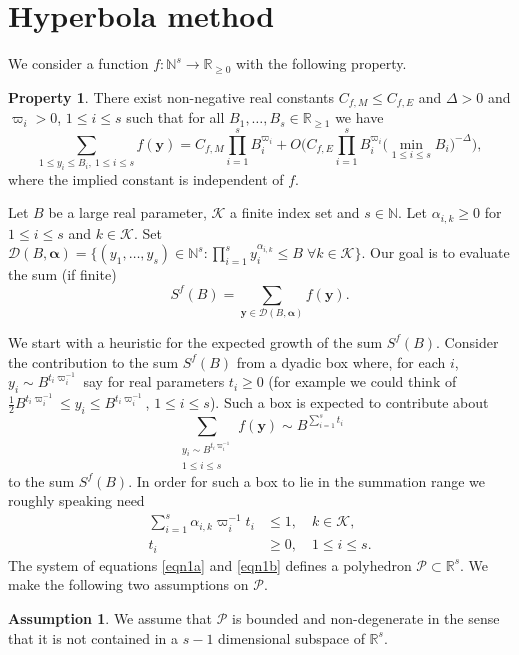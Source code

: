 \documentclass[JEP,XML,SOM,Unicode,published]{cedram}
\newcommand{\cD}{\mathcal{D}}
\newcommand{\cBalp}{\cD(B,\bfalp)}
\let\vardel\varDelta
\newcommand{\bfy}{\boldsymbol{y}}
\newcommand{\bfalp}{\boldsymbol{\alpha}}
\newcommand{\calK}{\mathcal{K}}
\newcommand{\calP}{\mathcal{P}}
\newcommand\NN{\mathbb{N}}
\newcommand{\N}{\mathbb{N}}
\newcommand\R{\mathbb{R}}
\theoremstyle{definition}
\newtheorem{assumption}[theorem]{Assumption}
\newtheorem{property}{Property}
\numberwithin{theorem}{section}
\begin{document}
\section{Hyperbola method}
\label{sec:hyperbola_method}

We consider a function $f: \N^s\rightarrow \R_{\geq 0}$ with the following property.

\begin{property}\label{property:I}
There exist non-negative real constants $C_{f,M}\leq C_{f,E}$ and $\vardel>0$ and $\varpi_i>0$, $1\leq i\leq s$ such that for all $B_1,\ldots, B_s\in \R_{\geq 1}$ we have\vspace*{-3pt}
\[
\sum_{1\leq y_i\leq B_i,\ 1\leq i\leq s} f(\bfy)= C_{f,M} \prod_{i=1}^s B_i^{\varpi_i} +O\biggl(C_{f,E} \prod_{i=1}^s B_i^{\varpi_i} \bigl(\min_{1\leq i\leq s} B_i\bigr)^{-\vardel}\biggr),
\]
where the implied constant is independent of $f$.
\end{property}

Let $B$ be a large real parameter, $\calK$ a finite index set and $s\in \N$. Let $\alpha_{i,k}\geq 0$ for $1\leq i\leq s$ and $k\in \calK$. Set $\cBalp=\{(y_1,\dots,y_s)\in\NN^s:\prod_{i=1}^sy_i^{\alpha_{i,k}}\leq B\;\forall k\in\calK\}$. Our goal is to evaluate the sum (if finite)\vspace*{-3pt}
\[
S^{f}(B)=\sum_{\bfy\in\cBalp}f(\bfy).
\]

We start with a heuristic for the expected growth of the sum $S^f(B)$. Consider the contribution to the sum $S^f(B)$ from a dyadic box where, for each $i$, $y_i\sim B^{t_i\varpi_i^{-1}}$ say for real parameters $t_i\geq 0$ (for example we could think of $\tfrac{1}{2} B^{t_i\varpi_i^{-1}}\leq y_i\leq B^{t_i\varpi_i^{-1}}$, $1\leq i\leq s$). Such a box is expected to contribute about
\[
\sum_{\substack{y_i\sim B^{t_i\varpi_i^{-1}}\\ 1\leq i\leq s}} f(\bfy) \sim B^{\sum_{i=1}^s t_i}
\]
to the sum $S^f(B)$.
In order for such a box to lie in the summation range we roughly speaking need\vspace*{-4pt}
\begin{align}\label{eqn1a}
\sum_{i=1}^s \alpha_{i,k} \varpi_i^{-1} t_i&\leq 1, \quad k\in \calK,
\\
\label{eqn1b}
t_i&\geq 0,\quad 1\leq i\leq s.
\end{align}
The system of equations \eqref{eqn1a} and \eqref{eqn1b} defines a polyhedron $\calP \subset \R^s$. We make the following two assumptions on $\calP$.

\begin{assumption}\label{assp10}
We assume that $\calP$ is bounded and non-degenerate in the sense that it is not contained in a $s-1$ dimensional subspace of $\R^s$.
\end{assumption}
\end{document}
